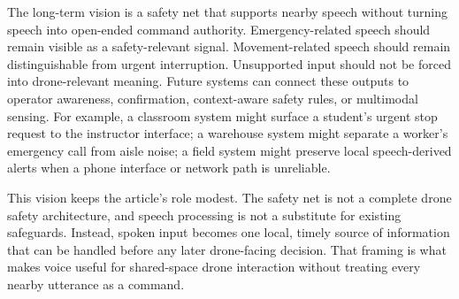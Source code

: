 The long-term vision is a safety net that supports nearby speech without turning speech into open-ended command authority. Emergency-related speech should remain visible as a safety-relevant signal. Movement-related speech should remain distinguishable from urgent interruption. Unsupported input should not be forced into drone-relevant meaning. Future systems can connect these outputs to operator awareness, confirmation, context-aware safety rules, or multimodal sensing. For example, a classroom system might surface a student's urgent stop request to the instructor interface; a warehouse system might separate a worker's emergency call from aisle noise; a field system might preserve local speech-derived alerts when a phone interface or network path is unreliable.

This vision keeps the article's role modest. The safety net is not a complete drone safety architecture, and speech processing is not a substitute for existing safeguards. Instead, spoken input becomes one local, timely source of information that can be handled before any later drone-facing decision. That framing is what makes voice useful for shared-space drone interaction without treating every nearby utterance as a command.
